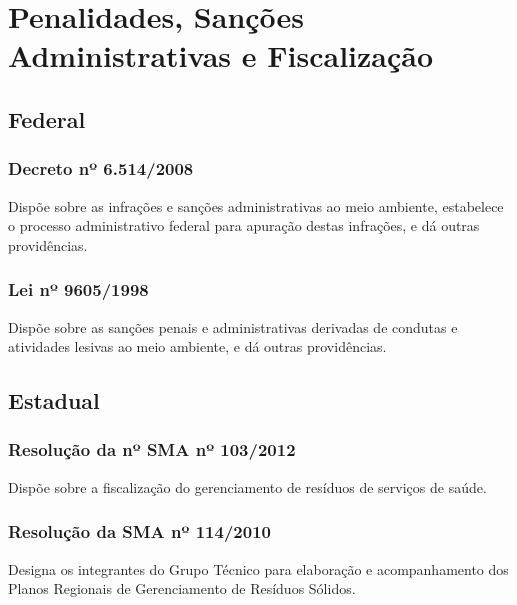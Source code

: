 \section{Penalidades, Sanções Administrativas e Fiscalização}

\begin{subapend}
	\subsection{Federal}
	\begin{subsubapend}
		\item \subsubsection{Decreto nº 6.514/2008}
		Dispõe sobre as infrações e sanções administrativas ao meio ambiente, estabelece o processo administrativo federal para apuração destas infrações, e dá outras providências.
		\subsubsection{Lei nº 9605/1998}
		Dispõe sobre as sanções penais e administrativas derivadas de condutas e atividades lesivas ao meio ambiente, e dá outras providências.
	\end{subsubapend}
\end{subapend}



\begin{subapend}
	\subsection{Estadual}
	\begin{subsubapend}
		\item \subsubsection{Resolução da nº SMA nº 103/2012}
		Dispõe sobre a fiscalização do gerenciamento de resíduos de serviços de saúde.
		\subsubsection{Resolução da SMA nº 114/2010}
		Designa os integrantes do Grupo Técnico para elaboração e acompanhamento dos Planos Regionais de Gerenciamento de Resíduos Sólidos.
	\end{subsubapend}
\end{subapend}

